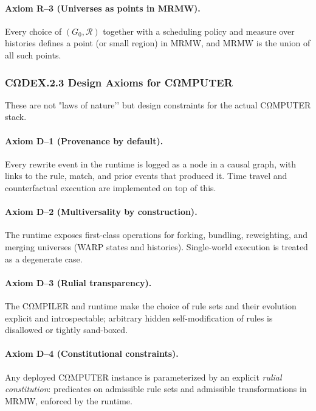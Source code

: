 \paragraph{Axiom R–3 (Universes as points in MRMW).}
Every choice of $(G_0,\mathcal{R})$ together with a scheduling policy
and measure over histories defines a point (or small region) in MRMW,
and MRMW is the union of all such points.

\subsubsection*{CΩDEX.2.3 \quad Design Axioms for CΩMPUTER}

These are not "laws of nature’’ but design constraints for the actual
CΩMPUTER stack.

\paragraph{Axiom D–1 (Provenance by default).}
Every rewrite event in the runtime is logged as a node in a causal graph,
with links to the rule, match, and prior events that produced it. Time
travel and counterfactual execution are implemented on top of this.

\paragraph{Axiom D–2 (Multiversality by construction).}
The runtime exposes first-class operations for forking, bundling,
reweighting, and merging universes (WARP states and histories). Single-world
execution is treated as a degenerate case.

\paragraph{Axiom D–3 (Rulial transparency).}
The CΩMPILER and runtime make the choice of rule sets and their evolution
explicit and introspectable; arbitrary hidden self-modification of rules
is disallowed or tightly sand-boxed.

\paragraph{Axiom D–4 (Constitutional constraints).}
Any deployed CΩMPUTER instance is parameterized by an explicit
\emph{rulial constitution}: predicates on admissible rule sets and
admissible transformations in MRMW, enforced by the runtime.

